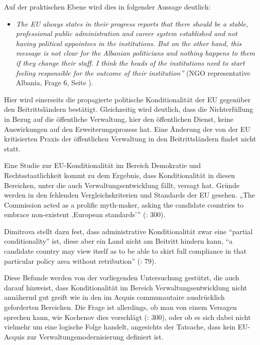 Auf der praktischen Ebene wird dies in folgender Aussage deutlich:
\begin{itemize}[label={}]
\item \textit{The EU always states in their progress reports that there should be a stable, professional public administration and career system established and not having political appointees in the institutions. But on the other hand, this message is not clear for the Albanian politicians and nothing happens to them if they change their staff. I think the heads of the institutions need to start feeling responsible for the outcome of their institution”} (NGO representative Albania, Frage 6, Seite \pageref{sec:par view}).
\end{itemize}
Hier wird einerseits die propagierte politische Konditionalität der EU gegenüber den Beitrittsländern bestätigt. Gleichzeitig wird deutlich, dass die Nichterfüllung in Bezug auf die öffentliche Verwaltung, hier den öffentlichen Dienst, keine Auswirkungen auf den Erweiterungsprozess hat. Eine Änderung der von der EU kritisierten Praxis der öffentlichen Verwaltung in den Beitrittsländern findet nicht statt.\par
Eine Studie zur EU-Konditionalität im Bereich Demokratie und Rechtsstaatlichkeit kommt zu dem Ergebnis, dass Konditionalität in diesen Bereichen, unter die auch Verwaltungsentwicklung fällt, versagt hat. Gründe werden in den fehlenden Vergleichskriterien und Standards der EU gesehen. „The Commission acted as a prolific myth-maker, asking the candidate countries to embrace non-existent ‚European standards’” (\cite{kochenov}: 300).\par
Dimitrova stellt dazu fest, dass administrative Konditionalität zwar eine “partial conditionality” ist, diese aber ein Land nicht am Beitritt hindern kann, “a candidate country may view itself as to be able to skirt full compliance in that particular policy area without retribution” (\cite{dimit05}: 79). \par
Diese Befunde werden von der vorliegenden Untersuchung gestützt, die auch darauf hinweist, dass Konditionalität im Bereich Verwaltungsentwicklung nicht annähernd gut greift wie in den im Acquis communautaire ausdrücklich geforderten Bereichen. Die Frage ist allerdings, ob man von einem Versagen sprechen kann, wie Kochenov dies vorschlägt (\cite{kochenov}: 300), oder ob es sich dabei nicht vielmehr um eine logische Folge handelt, angesichts der Tatsache, dass kein EU-Acquis zur Verwaltungsmodernisierung definiert ist.\par
